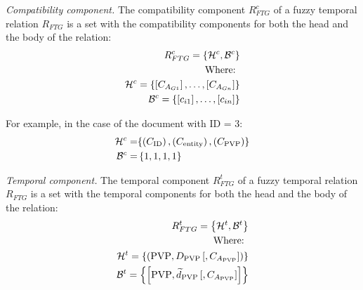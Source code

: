 \begin{definition}
\label{def:compatibility-component}
\emph{Compatibility component.}
The compatibility component $R^{c}_{FTG}$ of a fuzzy temporal relation $R_{FTG}$ is a set with the compatibility components for both the head and the body of the relation:
\begin{align}
\label{eq:compatibility-component}
R^{c}_{FTG} = \left \lbrace \mathcal{H}^{c},\mathcal{B}^{c} \right \rbrace \\
\nonumber
\text{Where: } \\
\nonumber
\mathcal{H}^{c} = \left \lbrace \left[C_{A_{G1}} \right], \ldots,  \left[C_{A_{Gn}} \right] \right \rbrace \\
\nonumber
\mathcal{B}^ {c} = \left \lbrace \left[ c_{i1} \right], \ldots, \left[ c_{in} \right] \right \rbrace 
\end{align}
\end{definition}

For example, in the case of the document with ID = 3:
\begin{align}
\nonumber
\mathcal{H}^{c} = & \lbrace \left(C_\text{ID}\right), \left(C_{\text{entity}}\right), \left(C_{\text{PVP}}\right) \rbrace \\
\nonumber
\mathcal{B}^ {c} = &\left \lbrace 1, 1, 1, 1 \right \rbrace 
\end{align}


\begin{definition}
\label{def:temporal-component}
\emph{Temporal component.}
The temporal component $R^{t}_{FTG}$ of a fuzzy temporal relation $R_{FTG}$ is a set with the temporal components for both the head and the body of the relation:
\begin{align}
\label{eq:temporal-component}
R^{t}_{FTG} = \left \lbrace \mathcal{H}^{t},\mathcal{B}^{t} \right \rbrace \\
\nonumber
\text{Where: } \\
\nonumber
\mathcal{H}^{t} = \left \lbrace \left( \text{PVP}, D_{\text{PVP}}\left[,C_{A_{\text{PVP}}} \right] \right) \right \rbrace \\
\nonumber
\mathcal{B}^ {t} = \left \lbrace  \left[ \text{PVP}, \widetilde{d}_{\text{PVP}} \left[,C_{A_{\text{PVP}}} \right] \right]  \right \rbrace 
\end{align}
\end{definition}

